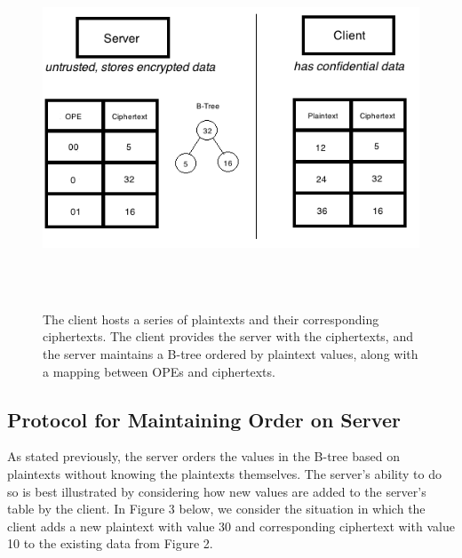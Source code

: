 \documentclass[12pt]{article}
\begin{document}
\begin{figure}[htb]
\begin{center}
\includegraphics[height=4.2in,width=6in,angle=0]{857pic6.png}
\caption{The client hosts a series of plaintexts and their corresponding ciphertexts. The client provides the server with the ciphertexts, and the server maintains a B-tree ordered by plaintext values, along with a mapping between OPEs and ciphertexts.}
\end{center}
\end{figure}

\subsection{Protocol for Maintaining Order on Server}

As stated previously, the server orders the values in the B-tree based on plaintexts without knowing the plaintexts themselves. The server's ability to do so is best illustrated by considering how new values are added to the server's table by the client. In Figure 3 below, we consider the situation in which the client adds a new plaintext with value 30 and corresponding ciphertext with value 10 to the existing data from Figure 2.
\end{document}
